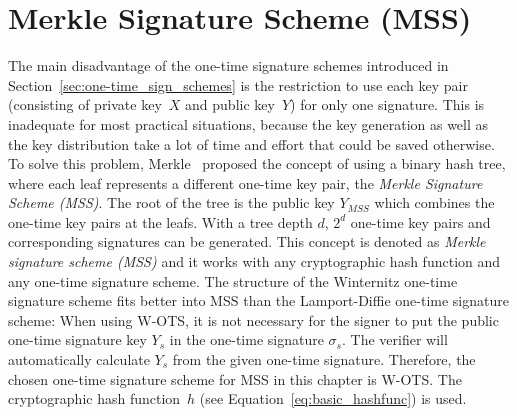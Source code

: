 

\section{Merkle Signature Scheme (MSS)} 
The main disadvantage of the one-time signature schemes introduced in Section~\ref{sec:one-time_sign_schemes} is the restriction to use each key pair (consisting of private key~$X$ and public key~$Y$) for only one signature. This is inadequate for most practical situations, because the key generation as well as the key distribution take a lot of time and effort that could be saved otherwise.
To solve this problem, Merkle~\cite{cha:bg_merkletrees_Merkle_1979} proposed the concept of using a binary hash tree, where each leaf represents a different one-time key pair, the \textit{Merkle Signature Scheme (MSS)}. The root of the tree is the public key $Y_{MSS}$  which combines the one-time key pairs at the leafs. With a tree depth $d$, $2^d$ one-time key pairs and corresponding signatures can be generated. %
This concept is denoted as \textit{Merkle signature scheme (MSS)} and it works with any cryptographic hash function and any one-time signature scheme. 
The structure of the Winternitz one-time signature scheme fits better into MSS than the Lamport-Diffie one-time signature scheme: When using W-OTS, it is not necessary for the signer to put the public one-time signature key $Y_s$ in the one-time signature $\sigma_s$. The verifier will automatically calculate $Y_s$ from the given one-time signature. Therefore, the chosen one-time signature scheme for MSS in this chapter is W-OTS. The cryptographic hash function~$h$ (see Equation~\ref{eq:basic_hashfunc}) is used. 

